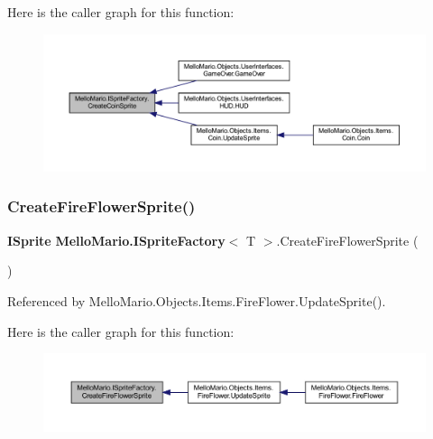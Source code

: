 Here is the caller graph for this function\+:
\nopagebreak
\begin{figure}[H]
\begin{center}
\leavevmode
\includegraphics[width=350pt]{interfaceMelloMario_1_1ISpriteFactory_aa409bcc08b42988337574c533bcc4c8b_icgraph}
\end{center}
\end{figure}
\mbox{\label{interfaceMelloMario_1_1ISpriteFactory_a24beee52d267a61d3a28482356024271}} 
\subsubsection{Create\+Fire\+Flower\+Sprite()}
{\footnotesize\ttfamily \textbf{ I\+Sprite} \textbf{ Mello\+Mario.\+I\+Sprite\+Factory}$<$ T $>$.Create\+Fire\+Flower\+Sprite (\begin{DoxyParamCaption}{ }\end{DoxyParamCaption})}



Referenced by Mello\+Mario.\+Objects.\+Items.\+Fire\+Flower.\+Update\+Sprite().

Here is the caller graph for this function\+:
\nopagebreak
\begin{figure}[H]
\begin{center}
\leavevmode
\includegraphics[width=350pt]{interfaceMelloMario_1_1ISpriteFactory_a24beee52d267a61d3a28482356024271_icgraph}
\end{center}
\end{figure}
\mbox{\label{interfaceMelloMario_1_1ISpriteFactory_a0b82b1e3e473fdc84b14657a7396376c}} 
